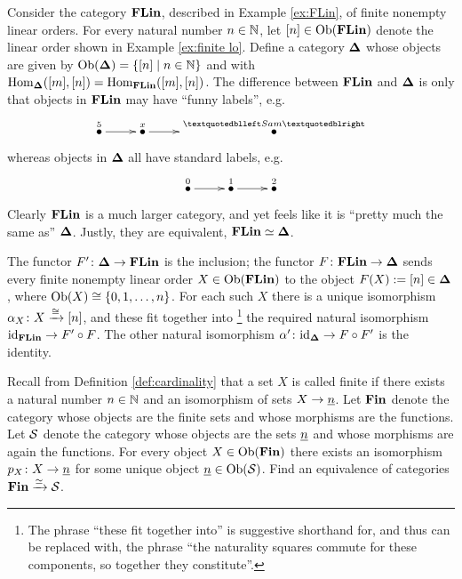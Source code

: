 \documentclass[CT4S-EN-RU]{subfiles}
\begin{document}
\begin{exampleRUS}\label{ex:indiscrete cat equiv to terminal}
\end{exampleRUS}

\begin{exampleENG}\label{ex:finite linear orders}
Consider the category ${\bf FLin}$, described in Example \ref{ex:FLin}, of finite nonempty linear orders. For every natural number $n\in{\mathbb N}$, let $[n]\in\textnormal{Ob}({\bf FLin})$ denote the linear order shown in Example \ref{ex:finite lo}. Define a category ${\bf \Delta}$ whose objects are given by $\textnormal{Ob}({\bf \Delta})=\{[n]{\;|\;}n\in{\mathbb N}\}$ and with $\textnormal{Hom}_{{\bf \Delta}}([m],[n])=\textnormal{Hom}_{{\bf FLin}}([m],[n])$. The difference between ${\bf FLin}$ and ${\bf \Delta}$ is only that objects in ${\bf FLin}$ may have “funny labels”, e.g. 
$$\xymatrix{\LMO{5}\ar[r]&\LMO{x}\ar[r]&\LMO{“Sam”}}$$ 
whereas objects in ${\bf \Delta}$ all have standard labels, e.g.
$$\xymatrix{\LMO{0}\ar[r]&\LMO{1}\ar[r]&\LMO{2}}$$
Clearly ${\bf FLin}$ is a much larger category, and yet feels like it is “pretty much the same as” ${\bf \Delta}$. Justly, they are equivalent, ${\bf FLin}\simeq{\bf \Delta}$. 

The functor $F'\colon{\bf \Delta}\rightarrow{\bf FLin}$ is the inclusion; the functor $F\colon{\bf FLin}\rightarrow{\bf \Delta}$ sends every finite nonempty linear order $X\in\textnormal{Ob}({\bf FLin})$ to the object $F(X):=[n]\in{\bf \Delta}$, where $\textnormal{Ob}(X)\cong\{0,1,\ldots,n\}$. For each such $X$ there is a unique isomorphism $\alpha_X\colon X\xrightarrow{\cong}[n]$, and these fit together into
\footnote{The phrase “these fit together into” is suggestive shorthand for, and thus can be replaced with, the phrase “the naturality squares commute for these components, so together they constitute”.}
the required natural isomorphism $\textnormal{id}_{{\bf FLin}}\rightarrow F'\circ F$. The other natural isomorphism $\alpha'\colon\textnormal{id}_{{\bf \Delta}}\rightarrow F\circ F'$ is the identity.
\end{exampleENG}

\begin{exampleRUS}\label{ex:finite linear orders}
\end{exampleRUS}

\begin{exerciseENG}
Recall from Definition \ref{def:cardinality} that a set $X$ is called finite if there exists a natural number $n\in{\mathbb N}$ and an isomorphism of sets $X\rightarrow\underline{n}$. Let ${\bf Fin}$ denote the category whose objects are the finite sets and whose morphisms are the functions. Let $\mathcal{S}$ denote the category whose objects are the sets $\underline{n}$ and whose morphisms are again the functions. For every object $X\in\textnormal{Ob}({\bf Fin})$ there exists an isomorphism $p_X\colon X\rightarrow\underline{n}$ for some unique object $\underline{n}\in\textnormal{Ob}(\mathcal{S})$. Find an equivalence of categories ${\bf Fin}\xrightarrow{\simeq}\mathcal{S}$. 
\end{exerciseENG}
\end{document}
